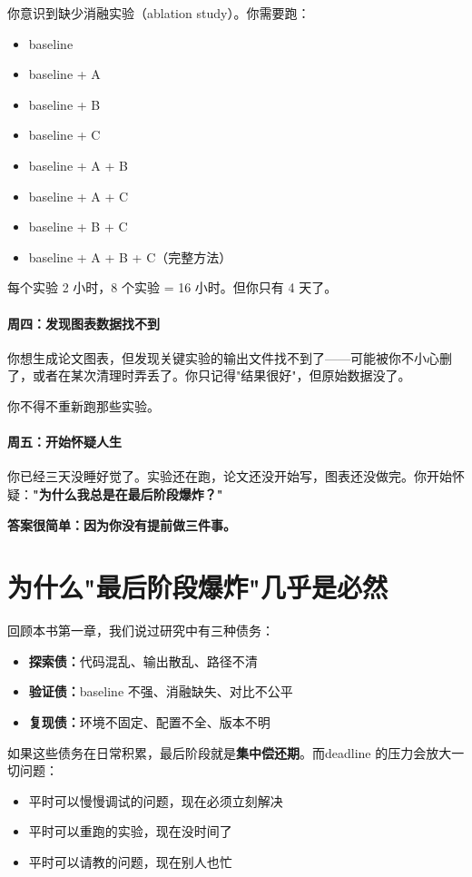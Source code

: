 你意识到缺少消融实验（ablation study）。你需要跑：
\begin{itemize}
  \item baseline
  \item baseline + A
  \item baseline + B
  \item baseline + C
  \item baseline + A + B
  \item baseline + A + C
  \item baseline + B + C
  \item baseline + A + B + C（完整方法）
\end{itemize}

每个实验 2 小时，8 个实验 = 16 小时。但你只有 4 天了。

\paragraph{周四：发现图表数据找不到}

你想生成论文图表，但发现关键实验的输出文件找不到了——可能被你不小心删了，或者在某次清理时弄丢了。你只记得"结果很好"，但原始数据没了。

你不得不重新跑那些实验。

\paragraph{周五：开始怀疑人生}

你已经三天没睡好觉了。实验还在跑，论文还没开始写，图表还没做完。你开始怀疑：\textbf{"为什么我总是在最后阶段爆炸？"}

\textbf{答案很简单：因为你没有提前做三件事。}

\section{为什么"最后阶段爆炸"几乎是必然}

回顾本书第一章，我们说过研究中有三种债务：
\begin{itemize}
  \item \textbf{探索债：}代码混乱、输出散乱、路径不清
  \item \textbf{验证债：}baseline 不强、消融缺失、对比不公平
  \item \textbf{复现债：}环境不固定、配置不全、版本不明
\end{itemize}

如果这些债务在日常积累，最后阶段就是\textbf{集中偿还期}。而deadline 的压力会放大一切问题：
\begin{itemize}
  \item 平时可以慢慢调试的问题，现在必须立刻解决
  \item 平时可以重跑的实验，现在没时间了
  \item 平时可以请教的问题，现在别人也忙
\end{itemize}

